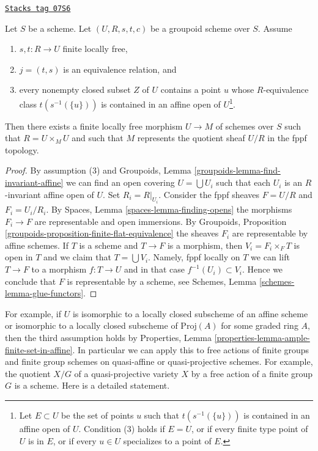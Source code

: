 \begin{proposition}
\label{spaces-properties-proposition-finite-flat-equivalence-global}
\href{https://stacks.math.columbia.edu/tag/07S6}{\texttt{Stacks tag 07S6}}

Let $S$ be a scheme.
Let $(U, R, s, t, c)$ be a groupoid scheme over $S$.
Assume
\begin{enumerate}
\item $s, t : R \to U$ finite locally free,
\item $j = (t, s)$ is an equivalence relation, and
\item every nonempty closed subset $Z$ of $U$ contains a point
$u$ whose $R$-equivalence class $t(s^{-1}(\{u\}))$ is contained
in an affine open of $U$\footnote{Let $E \subset U$ be the
set of points $u$ such that $t(s^{-1}(\{u\}))$
is contained in an affine open of $U$. Condition (3) holds
if $E = U$, or if every finite type point of $U$ is in $E$, or
if every $u \in U$ specializes to a point of $E$.}.
\end{enumerate}
Then there exists a finite locally free morphism $U \to M$
of schemes over $S$ such that $R = U \times_M U$ and such that $M$
represents the quotient sheaf $U/R$ in the fppf topology.
\end{proposition}

\begin{proof}
By assumption (3) and
Groupoids, Lemma \ref{groupoids-lemma-find-invariant-affine}
we can find an open covering $U = \bigcup U_i$ such that each $U_i$
is an $R$-invariant affine open of $U$. Set $R_i = R|_{U_i}$.
Consider the fppf sheaves $F = U/R$ and $F_i = U_i/R_i$.
By Spaces, Lemma \ref{spaces-lemma-finding-opens} the morphisms
$F_i \to F$ are representable and open immersions.
By Groupoids, Proposition \ref{groupoids-proposition-finite-flat-equivalence}
the sheaves $F_i$ are representable by affine schemes.
If $T$ is a scheme and $T \to F$ is a morphism, then $V_i = F_i \times_F T$
is open in $T$ and we claim that $T = \bigcup V_i$. Namely,
fppf locally on $T$ we can lift $T \to F$ to a morphism
$f : T \to U$ and in that case $f^{-1}(U_i) \subset V_i$.
Hence we conclude that $F$ is representable by a scheme, see
Schemes, Lemma \ref{schemes-lemma-glue-functors}.
\end{proof}

For example, if $U$ is isomorphic to a locally closed subscheme of an
affine scheme or isomorphic to a locally closed subscheme of
$\text{Proj}(A)$ for some graded ring $A$, then the third assumption holds by
Properties, Lemma \ref{properties-lemma-ample-finite-set-in-affine}.
In particular we can apply this to free actions of finite groups and
finite group schemes on quasi-affine or quasi-projective schemes.
For example, the quotient $X/G$ of a quasi-projective variety
$X$ by a free action of a finite group $G$ is a scheme. Here is a
detailed statement.


